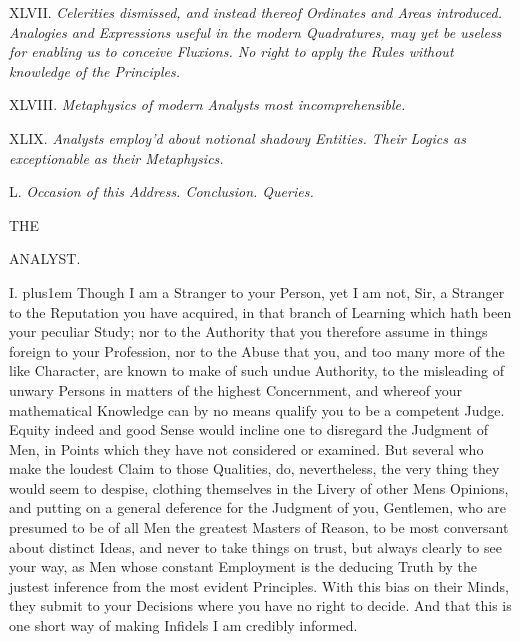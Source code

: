 \item{XLVII.}
{\it
Celerities dismissed, and instead thereof Ordinates and Areas
introduced.  Analogies and Expressions useful in the modern
Quadratures, may yet be useless for enabling us to conceive
Fluxions.  No right to apply the Rules without knowledge of the
Principles.}

\item{XLVIII.}
{\it
Metaphysics of modern Analysts most incomprehensible.}

\item{XLIX.}
{\it
Analysts employ'd about notional shadowy Entities.  Their Logics
as exceptionable as their Metaphysics.}

\item{L.}
{\it
Occasion of this Address.  Conclusion.  Queries.}

\par\endgroup

\vfill\eject


\null

\vfill\eject


\null\vskip36pt

\centerline{\largerm THE}

\vskip12pt

\centerline{\Largerm ANALYST.}

\vskip12pt

I. \hskip 0pt plus1em
Though I am a Stranger to your Person, yet I am not, Sir, a
Stranger to the Reputation you have acquired, in that branch of
Learning which hath been your peculiar Study; nor to the
Authority that you therefore assume in things foreign to your
Profession, nor to the Abuse that you, and too many more of the
like Character, are known to make of such undue Authority, to the
misleading of unwary Persons in matters of the highest
Concernment, and whereof your mathematical Knowledge can by no
means qualify you to be a competent Judge.  Equity indeed and
good Sense would incline one to disregard the Judgment of Men, in
Points which they have not considered or examined.  But several
who make the loudest Claim to those Qualities, do, nevertheless,
the very thing they would seem to despise, clothing themselves in
the Livery of other Mens Opinions, and putting on a general
deference for the Judgment of you, Gentlemen, who are presumed to
be of all Men the greatest Masters of Reason, to be most
conversant about distinct Ideas, and never to take things on
trust, but always clearly to see your way, as Men whose constant
Employment is the deducing Truth by the justest inference from
the most evident Principles.  With this bias on their Minds, they
submit to your Decisions where you have no right to decide.  And
that this is one short way of making Infidels I am credibly
informed.

